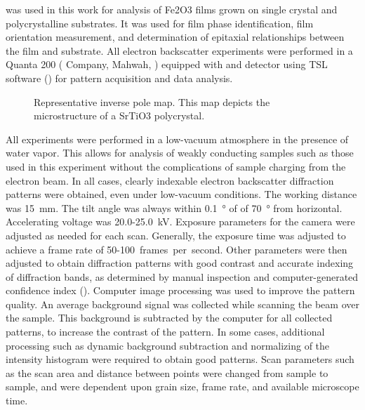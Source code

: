 \documentclass[12pt,%
              twoside,
               letterpaper]{uiothesis}
\begin{document}
 was used in this work for analysis of Fe2O3 films grown on single crystal
and polycrystalline substrates. It was used for film phase identification, film
orientation measurement, and determination of epitaxial relationships between the film and
substrate. All electron backscatter experiments were performed in a Quanta 200
 ( Company, Mahwah, ) equipped with and 
detector using TSL software () for pattern acquisition and data analysis.
\begin{figure}
\begin{center}
\caption[Representative  inverse pole map]{%
	Representative  inverse pole map. This map depicts the 
	microstructure of a SrTiO3 polycrystal.}
\label{fig:representativemap}
\end{center}
\end{figure}
All experiments were performed in a low-vacuum atmosphere in the presence of water vapor.
This allows for analysis of weakly conducting samples such as those used in this
experiment without the complications of sample charging from the electron beam. In all
cases, clearly indexable electron backscatter diffraction patterns were obtained, even
under low-vacuum conditions. The working distance was \SI{15}{\milli\meter}. The tilt
angle was always within \SI{0.1}{\degree} of of \SI{70}{\degree} from horizontal.
Accelerating voltage was 20.0-25.0~\si{\kilo\volt}. Exposure parameters for the 
camera were adjusted as needed for each scan. Generally, the exposure time was adjusted to
achieve a frame rate of 50-100~frames~per~second. Other parameters were then adjusted to
obtain diffraction patterns with good contrast and accurate indexing of diffraction bands,
as determined by manual inspection and computer-generated confidence index (). 
Computer image processing was used to improve the pattern quality. An average background
signal was collected while scanning the beam over the sample. This background is
subtracted by the computer for all collected patterns, to increase the contrast of the
pattern. In some cases, additional processing such as dynamic background subtraction and
normalizing of the intensity histogram were required to obtain good patterns. Scan
parameters such as the scan area and distance between points were changed from sample to
sample, and were dependent upon grain size, frame rate, and available microscope time.
\end{document}
